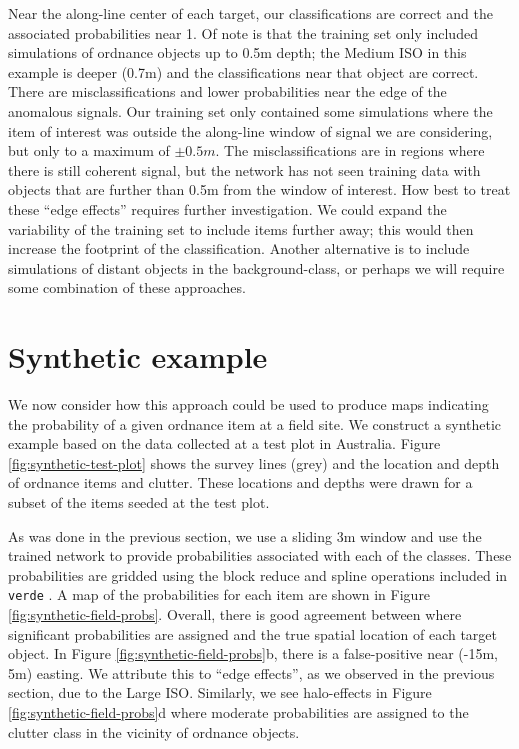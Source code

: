 \documentclass{segabs}
\begin{document}
Near the along-line center of each target, our classifications are correct and the associated probabilities near 1. Of note is that the training set only included simulations of ordnance objects up to 0.5m depth; the Medium ISO in this example is deeper (0.7m) and the classifications near that object are correct. There are misclassifications and lower probabilities near the edge of the anomalous signals. Our training set only contained some simulations where the item of interest was outside the along-line window of signal we are considering, but only to a maximum of $\pm 0.5m$. The misclassifications are in regions where there is still coherent signal, but the network has not seen training data with objects that are further than 0.5m from the window of interest. How best to treat these ``edge effects'' requires further investigation. We could expand the variability of the training set to include items further away; this would then increase the footprint of the classification. Another alternative is to include simulations of distant objects in the background-class, or perhaps we will require some combination of these approaches.





\section{Synthetic example}

We now consider how this approach could be used to produce maps indicating the probability of a given ordnance item at a field site. We construct a synthetic example based on the data collected at a test plot in Australia. Figure \ref{fig:synthetic-test-plot} shows the survey lines (grey) and the location and depth of ordnance items and clutter. These locations and depths were drawn for a subset of the items seeded at the test plot.

As was done in the previous section, we use a sliding 3m window and use the trained network to provide probabilities associated with each of the classes. These probabilities are gridded using the block reduce and spline operations included in \texttt{verde}  \citep{Uieda2018}. A map of the probabilities for each item are shown in Figure \ref{fig:synthetic-field-probs}. Overall, there is good agreement between where significant probabilities are assigned and the true spatial location of each target object. In Figure \ref{fig:synthetic-field-probs}b, there is a false-positive near (-15m, 5m) easting. We attribute this to ``edge effects'', as we observed in the previous section, due to the Large ISO. Similarly, we see halo-effects in Figure \ref{fig:synthetic-field-probs}d where moderate probabilities are assigned to the clutter class in the vicinity of ordnance objects.

\end{document}
